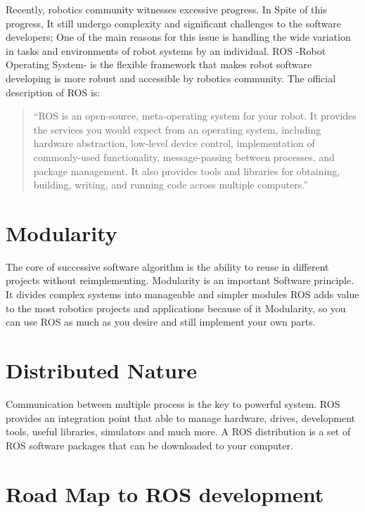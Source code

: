 
Recently, robotics community witnesses excessive progress. In Spite of this progress, It still undergo complexity and significant challenges to the software developers; One of the main reasons for this issue is  handling the wide variation in tasks and environments of robot systems by an individual. 
ROS -Robot Operating System- is the flexible framework that makes robot software developing is more robust and accessible by robotics community. The official description of ROS is:
\begin{quotation}
``ROS is an open-source, meta-operating system for your robot. It provides the services you would expect from an operating system, including hardware abstraction, low-level device control, implementation of commonly-used functionality, message-passing between processes, and package management. It also provides tools and libraries for obtaining, building, writing, and running code across multiple computers.''
\end{quotation}
    
\section{Modularity}
The core of successive software algorithm is the ability to reuse in different projects without reimplementing. Modularity is an important Software principle. It divides complex systems into manageable and simpler modules 
ROS adds value to the most robotics projects and applications because of it Modularity, so you can use ROS as much as you desire and still implement your own parts.
\section{Distributed Nature }
Communication between multiple process  is the key to powerful system. ROS provides an integration point that able to manage hardware, drives, development tools, useful libraries, simulators and much more. 
A ROS distribution is a set of ROS software packages that can be downloaded
to your computer.


\section{Road Map to ROS development}
